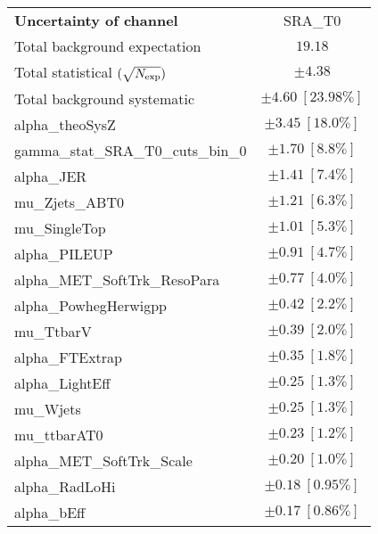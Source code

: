 
\begin{table}
\begin{center}
\setlength{\tabcolsep}{0.0pc}
\begin{tabular*}{\textwidth}{@{\extracolsep{\fill}}lc}
\noalign{\smallskip}\hline\noalign{\smallskip}
{\bf Uncertainty of channel}                                    & SRA\_T0            \\
\noalign{\smallskip}\hline\noalign{\smallskip}
Total background expectation             &  $19.18$       \\
\noalign{\smallskip}\hline\noalign{\smallskip}
Total statistical $(\sqrt{N_{\rm exp}})$              & $\pm 4.38$       \\
Total background systematic               & $\pm 4.60\ [23.98\%] $             \\
\noalign{\smallskip}\hline\noalign{\smallskip}
\noalign{\smallskip}\hline\noalign{\smallskip}
alpha\_theoSysZ         & $\pm 3.45\ [18.0\%] $       \\
gamma\_stat\_SRA\_T0\_cuts\_bin\_0         & $\pm 1.70\ [8.8\%] $       \\
alpha\_JER         & $\pm 1.41\ [7.4\%] $       \\
mu\_Zjets\_ABT0         & $\pm 1.21\ [6.3\%] $       \\
mu\_SingleTop         & $\pm 1.01\ [5.3\%] $       \\
alpha\_PILEUP         & $\pm 0.91\ [4.7\%] $       \\
alpha\_MET\_SoftTrk\_ResoPara         & $\pm 0.77\ [4.0\%] $       \\
alpha\_PowhegHerwigpp         & $\pm 0.42\ [2.2\%] $       \\
mu\_TtbarV         & $\pm 0.39\ [2.0\%] $       \\
alpha\_FTExtrap         & $\pm 0.35\ [1.8\%] $       \\
alpha\_LightEff         & $\pm 0.25\ [1.3\%] $       \\
mu\_Wjets         & $\pm 0.25\ [1.3\%] $       \\
mu\_ttbarAT0         & $\pm 0.23\ [1.2\%] $       \\
alpha\_MET\_SoftTrk\_Scale         & $\pm 0.20\ [1.0\%] $       \\
alpha\_RadLoHi         & $\pm 0.18\ [0.95\%] $       \\
alpha\_bEff         & $\pm 0.17\ [0.86\%] $       \\

\end{tabular*}
\end{center}
\end{table}
